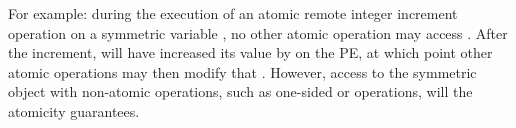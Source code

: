 For example: during the execution of an atomic remote integer increment
operation on a symmetric variable , no other \openshmem atomic
operation may access .  After the increment,  will have
increased its value by  on the \target{} \ac{PE}, at which point other
atomic operations may then modify that .
However, access to the symmetric object  with non-atomic operations, such as one-sided \PUT{} or \GET{} operations, will  the atomicity guarantees.

